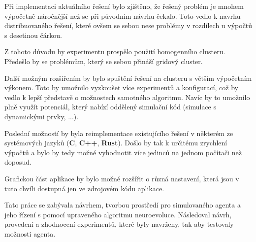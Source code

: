 
Při implementaci aktuálního řešení bylo zjištěno, že řešený problém je mnohem výpočetně náročnější než se při původním návrhu čekalo. Toto vedlo k navrhu distribuovaného řešení, které ovšem se sebou nese problémy v rozdílech u výpočtů s desetinou čárkou.

Z tohoto důvodu by experimentu prospělo použití homogenního clusteru. Předešlo by se problémům, který se sebou přináší gridový cluster.

Další možným rozšířením by bylo spuštění řešení na clusteru s větším výpočetním výkonem. Toto by umožnilo vyzkoušet více experimentů a konfigurací, což by vedlo k lepší představě o  možnostech samotného algoritmu. Navíc by to umožnilo plně využít potenciál, který nabízí oddělený simulační kód (simulace s dynamickými prvky, ...). 

Poslední možností by byla reimplementace existujícího řešení v některém ze systémových jazyků (\textbf{C}, \textbf{C++}, \textbf{Rust}). Došlo by tak k určitému zrychlení výpočtů a bylo by tedy možné vyhodnotit více jedinců na jednom počítači než doposud. 

Grafickou část aplikace by bylo možné rozšířit o různá nastavení, která jsou v tuto chvíli dostupná jen ve zdrojovém kódu aplikace.

Tato práce se zabývala návrhem, tvorbou prostředí pro simulovaného agenta a jeho řízení s pomocí upraveného algoritmu neuroevoluce. Následoval návrh, provedení a zhodnocení experimentů, které byly navrženy, tak aby testovaly možnosti agenta.
